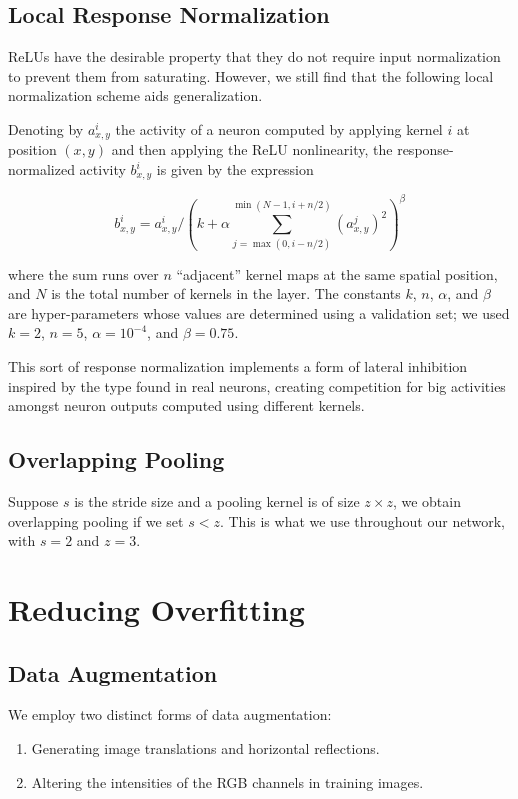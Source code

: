 \documentclass[a4paper,12pt]{article}
\begin{document}
\subsection{Local Response Normalization}

ReLUs have the desirable property that they do not require input normalization to prevent them from saturating. However, we still find that the following local normalization scheme aids generalization.

Denoting by $a^i_{x,y}$ the activity of a neuron computed by applying kernel $i$ at position $(x,y)$ and then applying the ReLU nonlinearity, the response-normalized activity $b^i_{x,y}$ is given by the expression

\[b^i_{x,y} = a^i_{x,y}/\left(k + \alpha\sum_{j=\max(0, i-n/2)}^{\min(N-1,i+n/2)}{(a^j_{x,y})^2}\right)^{\beta}\]

where the sum runs over $n$ “adjacent” kernel maps at the same spatial position, and $N$ is the total number of kernels in the layer. The constants $k$, $n$, $\alpha$, and $\beta$ are hyper-parameters whose values are determined using a validation set; we used $k = 2$, $n = 5$, $\alpha = 10^{-4}$, and $\beta = 0.75$.

This sort of response normalization implements a form of lateral inhibition inspired by the type found in real neurons, creating competition for big activities amongst neuron outputs computed using different kernels.

\subsection{Overlapping Pooling}

Suppose $s$ is the stride size and a pooling kernel is of size $z \times z$, we obtain overlapping pooling if we set $s < z$. This is what we use throughout our network, with $s = 2$ and $z = 3$.

\section{Reducing Overfitting}

\subsection{Data Augmentation}

We employ two distinct forms of data augmentation:

\begin{enumerate}
  \item Generating image translations and horizontal reflections.
  \item Altering the intensities of the RGB channels in training images.
\end{enumerate}
\end{document}
